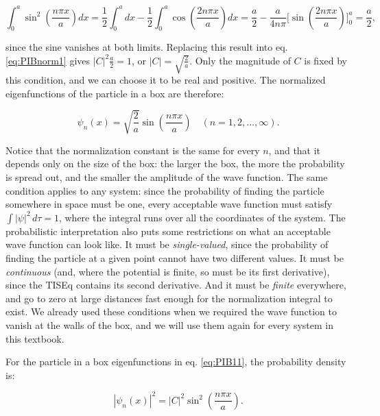 \documentclass[
  english,
  9pt,
]{extbook}
\theoremstyle{definition}
\theoremstyle{definition}
\theoremstyle{definition}
\theoremstyle{definition}
\theoremstyle{remark}
\begin{document}
\begin{equation}
\int_0^a \sin^2\left(\frac{n\pi x}{a}\right) dx = \frac{1}{2}\int_0^a dx - \frac{1}{2}\int_0^a \cos\left(\frac{2n\pi x}{a}\right) dx = \frac{a}{2} - \frac{a}{4n\pi}\Big[\sin\left(\frac{2n\pi x}{a}\right)\Big]_0^a = \frac{a}{2},
\label{eq:PIBnorm2}
\end{equation}

since the sine vanishes at both limits. Replacing this result into eq. \eqref{eq:PIBnorm1} gives \(|C|^2\frac{a}{2}=1\), or \(|C|=\sqrt{\frac{2}{a}}\). Only the magnitude of \(C\) is fixed by this condition, and we can choose it to be real and positive. The normalized eigenfunctions of the particle in a box are therefore:

\begin{equation}
\psi_n(x) = \sqrt{\frac{2}{a}}\sin\left(\frac{n\pi x}{a}\right) \quad (n=1,2,\ldots,\infty).
\label{eq:PIBnorm3}
\end{equation}

Notice that the normalization constant is the same for every \(n\), and that it depends only on the size of the box: the larger the box, the more the probability is spread out, and the smaller the amplitude of the wave function. The same condition applies to any system: since the probability of finding the particle somewhere in space must be one, every acceptable wave function must satisfy \(\int |\psi|^2\, d\tau = 1\), where the integral runs over all the coordinates of the system. The probabilistic interpretation also puts some restrictions on what an acceptable wave function can look like. It must be \emph{single-valued}, since the probability of finding the particle at a given point cannot have two different values. It must be \emph{continuous} (and, where the potential is finite, so must be its first derivative), since the TISEq contains its second derivative. And it must be \emph{finite} everywhere, and go to zero at large distances fast enough for the normalization integral to exist. We already used these conditions when we required the wave function to vanish at the walls of the box, and we will use them again for every system in this textbook.

For the particle in a box eigenfunctions in eq. \eqref{eq:PIB11}, the probability density is:

\begin{equation}
|\psi_n(x)|^2 = |C|^2 \sin^2\left(\frac{n\pi x}{a}\right).
\label{eq:PIB14}
\end{equation}
\end{document}
